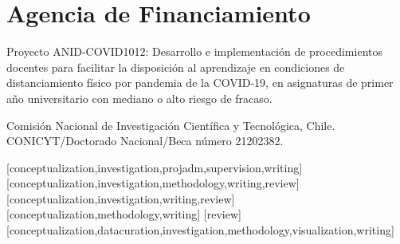 \documentclass[spanish]{textolivre}
\begin{document}
\section*{Agencia de Financiamiento}
Proyecto ANID-COVID1012: Desarrollo e implementación de procedimientos docentes para facilitar la disposición al aprendizaje en condiciones de distanciamiento físico por pandemia de la COVID-19, en asignaturas de primer año universitario con mediano o alto riesgo de fracaso.

Comisión Nacional de Investigación Científica y Tecnológica, Chile. CONICYT/Doctorado Nacional/Beca número 21202382.

\printbibliography\label{sec-bib}

\begin{contributors}
[conceptualization,investigation,projadm,supervision,writing]
[conceptualization,investigation,methodology,writing,review]
[conceptualization,investigation,writing,review]
[conceptualization,methodology,writing]
[review]
[conceptualization,datacuration,investigation,methodology,visualization,writing]
\end{contributors}


\end{document}
